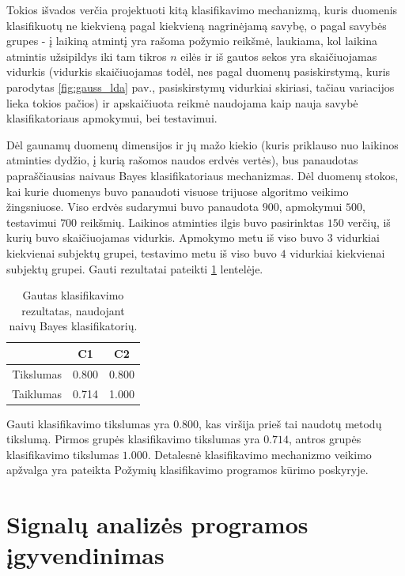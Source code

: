 \documentclass[]{vgtuef}
\begin{document}
Tokios išvados verčia projektuoti kitą klasifikavimo mechanizmą, kuris duomenis klasifikuotų ne kiekvieną pagal kiekvieną nagrinėjamą savybę, o pagal savybės grupes - į laikiną atmintį yra rašoma požymio reikšmė, laukiama, kol laikina atmintis užsipildys iki tam tikros $n$ eilės ir iš gautos sekos yra skaičiuojamas vidurkis (vidurkis skaičiuojamas todėl, nes pagal duomenų pasiskirstymą, kuris parodytas \ref{fig:gauss_lda} pav., pasiskirstymų vidurkiai skiriasi, tačiau variacijos lieka tokios pačios) ir apskaičiuota reikmė naudojama kaip nauja savybė klasifikatoriaus apmokymui, bei testavimui. 

Dėl gaunamų duomenų dimensijos ir jų mažo kiekio (kuris priklauso nuo laikinos atminties dydžio, į kurią rašomos naudos erdvės vertės), bus panaudotas papraščiausias naivaus Bayes klasifikatoriaus mechanizmas. Dėl duomenų stokos, kai kurie duomenys buvo panaudoti visuose trijuose algoritmo veikimo žingsniuose. Viso erdvės sudarymui buvo panaudota $900$, apmokymui $500$, testavimui $700$ reikšmių. Laikinos atminties ilgis buvo pasirinktas $150$ verčių, iš kurių buvo skaičiuojamas vidurkis. Apmokymo metu iš viso buvo $3$ vidurkiai kiekvienai subjektų grupei, testavimo metu iš viso buvo $4$ vidurkiai kiekvienai subjektų grupei. Gauti rezultatai pateikti \ref{table:classification_results} lentelėje.

\begin{table}
	\centering
	\caption{Gautas klasifikavimo rezultatas, naudojant naivų Bayes klasifikatorių.}
	\label{table:classification_results}
	\begin{tabular}{|c|c|c|} \hline
		& C1 & C2 \\ \hline
    Tikslumas & 0.800 & 0.800 \\ \hline
    Taiklumas & 0.714 & 1.000 \\ \hline
	\end{tabular}
\end{table}

Gauti klasifikavimo tikslumas yra $0.800$, kas viršija prieš tai naudotų metodų tikslumą. Pirmos grupės klasifikavimo tikslumas yra $0.714$, antros grupės klasifikavimo tikslumas $1.000$. Detalesnė klasifikavimo mechanizmo veikimo apžvalga yra pateikta Požymių klasifikavimo programos kūrimo poskyryje.

\section{Signalų analizės programos įgyvendinimas}
\end{document}
